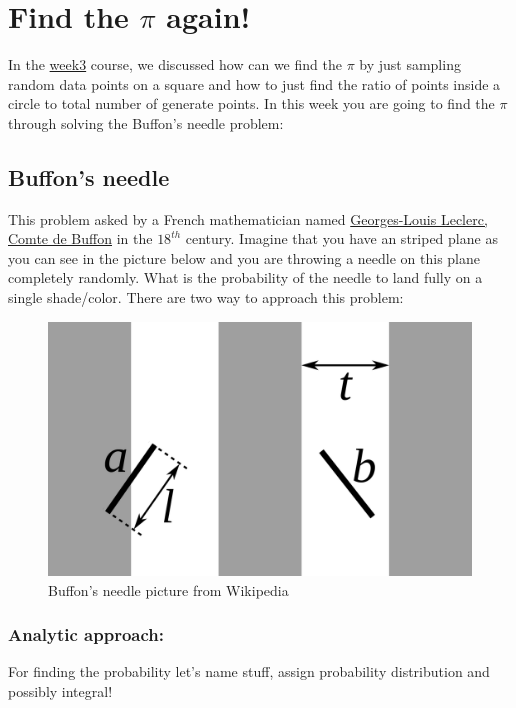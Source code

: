 \documentclass[12pt,letterpaper]{article}
\begin{document}
\section*{Find the $\pi$ again!}
In the \href{https://abtinshahidi.github.io/teaching/2019-spring-foundation-machine-learning/week3}{week3} course, we discussed how can we find the $\pi$ by just sampling random data points on a square and how to just find the ratio of points inside a circle to total number of generate points. In this week you are going to find the $\pi$ through solving the Buffon's needle problem:

\subsection*{Buffon's needle}
This problem asked by a French mathematician named \href{https://en.wikipedia.org/wiki/Georges-Louis_Leclerc,_Comte_de_Buffon}{Georges-Louis Leclerc, Comte de Buffon} in the $18^{th}$ century. Imagine that you have an striped plane as you can see in the picture below and you are throwing a needle on this plane completely randomly. What is the probability of the needle to land fully on a single shade/color. There are two way to approach this problem:

\begin{figure}[ht]
\begin{center}
\includegraphics[scale=0.1]{buffon.png}
\end{center}
\caption{Buffon's needle picture from Wikipedia}
\end{figure}

\subsubsection*{Analytic approach:}
For finding the probability let's name stuff, assign probability distribution and possibly integral!
\end{document}
